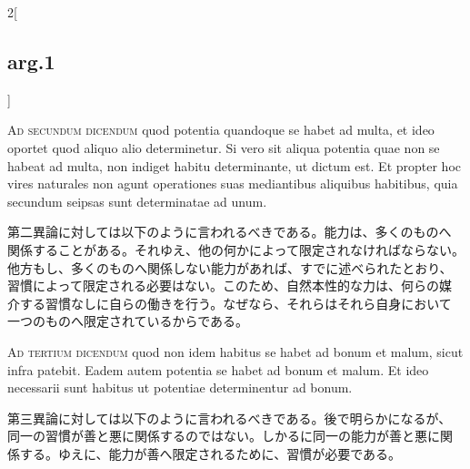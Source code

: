 \documentclass[paper=a4paper,fontsize=10pt,jafontsize=9pt,titlepage]{jlreq}
\begin{document}
\begin{paracol}{2}[\subsection{arg.1}]
\switchcolumn*[\subsection{ad.2}]

{\scshape Ad secundum dicendum} quod potentia
quandoque se habet ad multa, et ideo oportet quod aliquo alio
determinetur. Si vero sit aliqua potentia quae non se habeat ad multa,
non indiget habitu determinante, ut dictum est. Et propter hoc vires
naturales non agunt operationes suas mediantibus aliquibus habitibus,
quia secundum seipsas sunt determinatae ad unum.

\switchcolumn

第二異論に対しては以下のように言われるべきである。能力は、多くのものへ
関係することがある。それゆえ、他の何かによって限定されなければならない。
他方もし、多くのものへ関係しない能力があれば、すでに述べられたとおり、
習慣によって限定される必要はない。このため、自然本性的な力は、何らの媒
介する習慣なしに自らの働きを行う。なぜなら、それらはそれら自身において
一つのものへ限定されているからである。

\switchcolumn*[\subsection{ad.3}]

{\scshape Ad tertium dicendum} quod non idem habitus se habet ad bonum et malum,
sicut infra patebit. Eadem autem potentia se habet ad bonum et
malum. Et ideo necessarii sunt habitus ut potentiae determinentur ad
bonum.

\switchcolumn

第三異論に対しては以下のように言われるべきである。後で明らかになるが、
同一の習慣が善と悪に関係するのではない。しかるに同一の能力が善と悪に関
係する。ゆえに、能力が善へ限定されるために、習慣が必要である。

\end{paracol}
\end{document}
